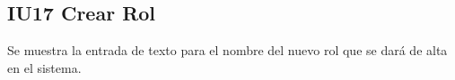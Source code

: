 \newpage
\subsection{IU17 Crear Rol}
	Se muestra la entrada de texto para el nombre del nuevo rol que se dará de alta en el sistema.
